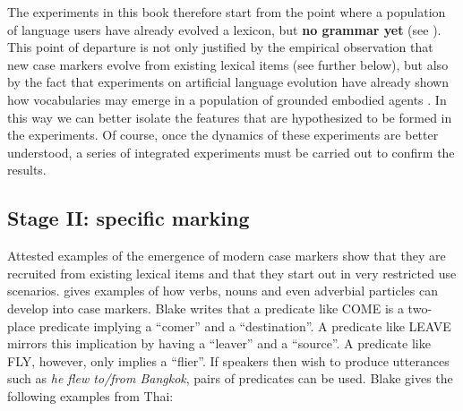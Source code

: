 The experiments in this book therefore start from the point where a population of language users have already evolved a lexicon, but {\bfseries no grammar yet} (see ). This point of departure is not only justified by the empirical observation that new case markers evolve from existing lexical items (see further below), but also by the fact that experiments on artificial language evolution have already shown how vocabularies may emerge in a population of grounded embodied agents \citep[e.g.][]{steels96emergent, steels96selforganizing, steels97selforganizing}. In this way we can better isolate the features that are hypothesized to be formed in the experiments. Of course, once the dynamics of these experiments are better understood, a series of integrated experiments must be carried out to confirm the results.

\subsection{Stage II: specific marking}
\label{s:stage2}

\largerpage
Attested examples of the emergence of modern case markers show that they are recruited from existing lexical items and that they start out in very restricted use scenarios. \citet[chapter 6]{blake94case} gives examples of how verbs, nouns and even adverbial particles can develop into case markers. Blake writes that a predicate like COME is a two-place predicate implying a ``comer'' and a ``destination''. A predicate like LEAVE mirrors this implication by having a ``leaver'' and a ``source''. A predicate like FLY, however, only implies a ``flier''. If speakers then wish to produce utterances such as {\em he flew to/from Bangkok}, pairs of predicates can be used. Blake gives the following examples from Thai:

\eal
\label{e:thai}
\hspace{0.2cm}\citep[163--164]{blake94case}
\zl


